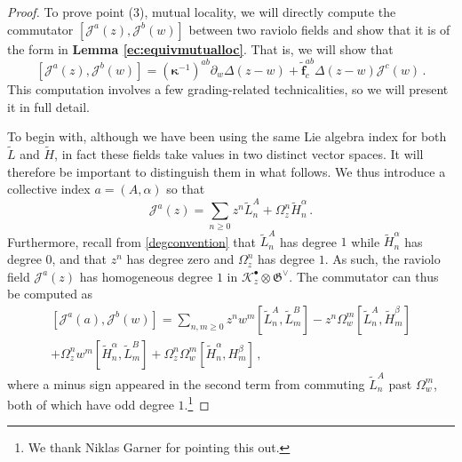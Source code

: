 \documentclass[11pt]{amsart}
\newcommand{\tL}{{\tilde L}}
\newcommand{\tH}{{\tilde H}}
\newcommand{\CJ}{{\mathcal J}}
\numberwithin{equation}{section}
\numberwithin{figure}{section}
\numberwithin{table}{section}
\theoremstyle{thm}
\numberwithin{equation}{subsection}
\theoremstyle{definition}
\theoremstyle{rem}
\begin{document}
\begin{proof}
\medskip

To prove point (3), mutual locality, we will directly compute the commutator $[\mathcal{J}^a(z),\mathcal{J}^b(w)]$ between two raviolo fields and show that it is of the form in \textbf{Lemma \ref{ec:equivmutualloc}}. That is, we will show that 
\begin{equation}
\label{ec:point3aim}
    [\mathcal{J}^a(z),\mathcal{J}^b(w)]= (\bm{\kappa}^{-1})^{ab}\partial_w\Delta(z-w) + \mathbf{\tilde f}^{ab}_c\Delta(z-w)\mathcal{J}^c(w)\,.
\end{equation}
This computation involves a few grading-related technicalities, so we will present it in full detail.


To begin with, although we have been using the same Lie algebra index for both $\tL$  and $\tH$, in fact these fields take values in two distinct vector spaces. It will therefore be important to distinguish them in what follows. We thus introduce a collective index $a=(A,\alpha)$ so that
\begin{equation}
    \mathcal{J}^{a}(z)=\sum_{n\geq 0}z^n\tL^A_n + \Omega_z^n\tH^\alpha_n \,.
\end{equation}
Furthermore, recall from \eqref{degconvention} that $\tilde L_n^A$ has degree $1$ while $\tilde H_n^\alpha$ has degree $0$, and that $z^n$ has degree zero and $\Omega_z^n$ has degree $1$. As such, the raviolo field $\mathcal{J}^a(z)$ has homogeneous degree $1$ in $\mathcal{K}^\bullet_z \otimes \mathfrak{G}^\vee$. The commutator can thus be computed as
\begin{multline}
\label{ec:finalcom}
    [\CJ^a(a),\CJ^b(w)]=\sum_{n,m\geq 0} z^nw^m[\tL_n^A,\tL_m^B]-z^n\Omega^m_w[\tL_n^A,\tH_m^\beta]\\
    +\Omega_z^nw^m[\tH_n^\alpha,\tL_m^B]+\Omega_z^n\Omega_w^m[\tH_n^\alpha,H_m^\beta]\,,
\end{multline}
where a minus sign appeared in the second term from commuting $\tilde L_n^A$ past $\Omega_w^m$, both of which have odd degree $1$.\footnote{We thank Niklas Garner for pointing this out.} 



\end{proof}
\end{document}

